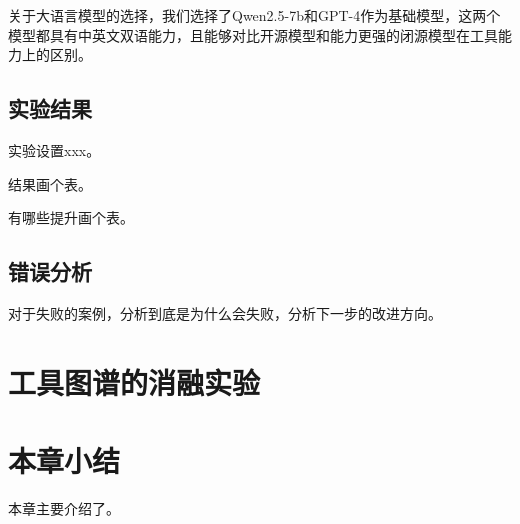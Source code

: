 关于大语言模型的选择，我们选择了Qwen2.5-7b和GPT-4作为基础模型，这两个模型都具有中英文双语能力，且能够对比开源模型和能力更强的闭源模型在工具能力上的区别。

\subsection{实验结果}

实验设置xxx。

结果画个表。

有哪些提升画个表。

\label{subsec:exp_results}

\subsection{错误分析}
\label{subsec:error_analysis}

对于失败的案例，分析到底是为什么会失败，分析下一步的改进方向。

\section{工具图谱的消融实验}



\section{本章小结}

本章主要介绍了。